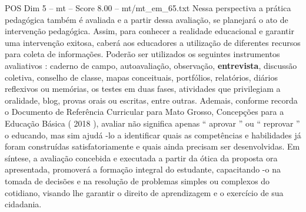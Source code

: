 \begin{textsample}{POS Dim 5 – mt – Score 8.00 – mt/mt\_em\_65.txt}
Nessa perspectiva a prática pedagógica também é avaliada e a partir dessa avaliação, se planejará o ato de intervenção pedagógica.
Assim, para conhecer a realidade educacional e garantir uma intervenção exitosa, caberá aos educadores a utilização de diferentes recursos para coleta de informações.
Poderão ser utilizados os seguintes instrumentos avaliativos : caderno de campo, autoavaliação, observação, \textbf{entrevista}, discussão coletiva, conselho de classe, mapas conceituais, portfólios, relatórios, diários reflexivos ou memórias, os testes em duas fases, atividades que privilegiam a oralidade, blog, provas orais ou escritas, entre outras.
Ademais, conforme recorda o Documento de Referência Curricular para Mato Grosso, Concepções para a Educação Básica ( 2018 ), avaliar não significa apenas “ aprovar ” ou “ reprovar ” o educando, mas sim ajudá -lo a identificar quais as competências e habilidades já foram construídas satisfatoriamente e quais ainda precisam ser desenvolvidas.
Em síntese, a avaliação concebida e executada a partir da ótica da proposta ora apresentada, promoverá a formação integral do estudante, capacitando -o na tomada de decisões e na resolução de problemas simples ou complexos do cotidiano, visando lhe garantir o direito de aprendizagem e o exercício de sua cidadania.

\end{textsample}
